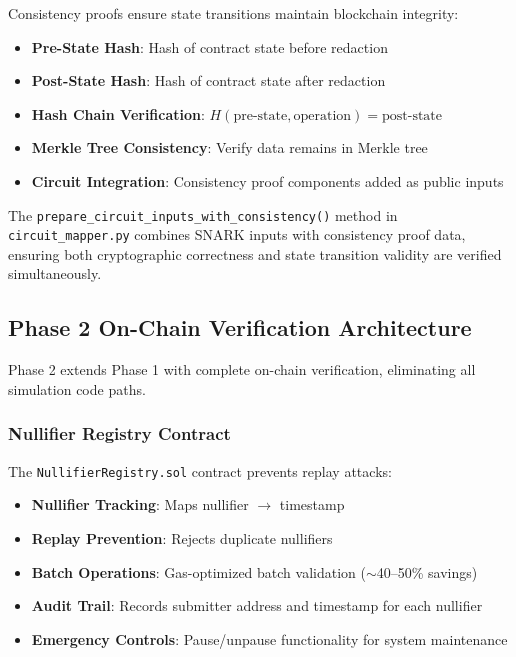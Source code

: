 Consistency proofs ensure state transitions maintain blockchain integrity:

\begin{itemize}
    \item \textbf{Pre-State Hash}: Hash of contract state before redaction
    \item \textbf{Post-State Hash}: Hash of contract state after redaction
    \item \textbf{Hash Chain Verification}: $H(\text{pre-state}, \text{operation}) = \text{post-state}$
    \item \textbf{Merkle Tree Consistency}: Verify data remains in Merkle tree
    \item \textbf{Circuit Integration}: Consistency proof components added as public inputs
\end{itemize}

The \texttt{prepare\_circuit\_inputs\_with\_consistency()} method in \texttt{circuit\_mapper.py} combines SNARK inputs with consistency proof data, ensuring both cryptographic correctness and state transition validity are verified simultaneously.

\subsection{Phase 2 On-Chain Verification Architecture}

Phase 2 extends Phase 1 with complete on-chain verification, eliminating all simulation code paths.

\subsubsection{Nullifier Registry Contract}

The \texttt{NullifierRegistry.sol} contract prevents replay attacks:

\begin{itemize}
    \item \textbf{Nullifier Tracking}: Maps nullifier $\rightarrow$ timestamp
    \item \textbf{Replay Prevention}: Rejects duplicate nullifiers
    \item \textbf{Batch Operations}: Gas-optimized batch validation ($\sim$40--50\% savings)
    \item \textbf{Audit Trail}: Records submitter address and timestamp for each nullifier
    \item \textbf{Emergency Controls}: Pause/unpause functionality for system maintenance
\end{itemize}

